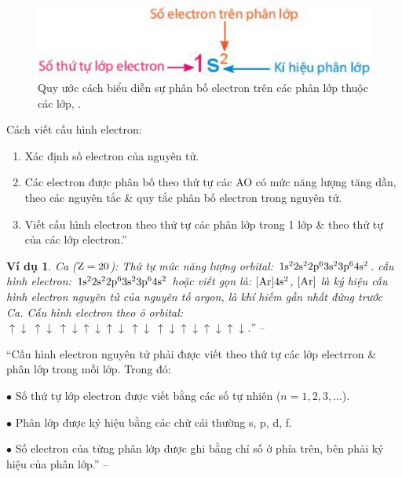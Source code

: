 \documentclass[oneside]{book}
\numberwithin{equation}{section}
\newtheorem{vidu}{Ví dụ}[section]
\begin{document}
\begin{figure}[H]
	\centering
	\includegraphics[scale=0.15]{quy_uoc_cach_bieu_dien_su_phan_bo_electron_tren_cac_phan_lop_thuoc_cac_lop}
	\caption{Quy ước cách biểu diễn sự phân bố electron trên các phân lớp thuộc các lớp, \cite[p. 32]{SGK_Hoa_Hoc_10_Chan_Troi_Sang_Tao}.}
\end{figure}
Cách viết cấu hình electron:
\begin{enumerate}
	\item Xác định số electron của nguyên tử.
	\item Các electron được phân bố theo thứ tự các AO có mức năng lượng tăng dần, theo các nguyên tắc \& quy tắc phân bố electron trong nguyên tử.
	\item Viết cấu hình electron theo thứ tự các phân lớp trong 1 lớp \& theo thứ tự của các lớp electron.''
\end{enumerate}

\begin{vidu}
	Ca ($\rm Z = 20$): Thứ tự mức năng lượng orbital: $\rm 1s^22s^22p^63s^23p^64s^2$. cấu hình electron: $\rm 1s^22s^22p^63s^23p^64s^2$ hoặc viết gọn là: $\rm[Ar]4s^2$, $\rm[Ar]$ là ký hiệu cấu hình electron nguyên tử của nguyên tố argon, là khí hiếm gần nhất đứng trước Ca. Cấu hình electron theo ô orbital: $\boxed{\uparrow\downarrow}\ \boxed{\uparrow\downarrow}\ \boxed{\uparrow\downarrow}\boxed{\uparrow\downarrow}\boxed{\uparrow\downarrow}\ \boxed{\uparrow\downarrow}\ \boxed{\uparrow\downarrow}\boxed{\uparrow\downarrow}\boxed{\uparrow\downarrow}\boxed{\uparrow\downarrow}$.'' -- \cite[p. 32]{SGK_Hoa_Hoc_10_Chan_Troi_Sang_Tao}
\end{vidu}
``Cấu hình electron nguyên tử phải được viết theo thứ tự các lớp electrron \& phân lớp trong mỗi lớp. Trong đó:
\begin{enumerate*}
	\item[$\bullet$] Số thứ tự lớp electron được viết bằng các số tự nhiên ($n = 1,2,3,\ldots$).
	\item[$\bullet$] Phân lớp được ký hiệu bằng các chữ cái thường s, p, d, f.
	\item[$\bullet$] Số electron của từng phân lớp được ghi bằng chỉ số ở phía trên, bên phải ký hiệu của phân lớp.'' -- \cite[p. 32]{SGK_Hoa_Hoc_10_Chan_Troi_Sang_Tao}
\end{enumerate*}
\end{document}
